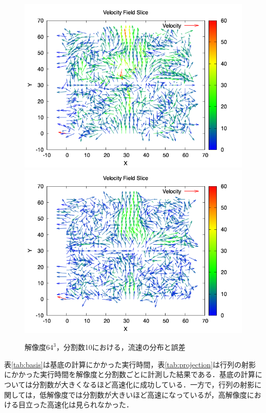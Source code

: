 \documentclass[a4j,12pt]{jreport}
\begin{document}
\begin{figure}[htbp]
\caption{$解像度64^3$，分割数10における，流速の分布と誤差}
\label{fig:n128_vel}
\centering
\includegraphics[width=140mm]{images/velocity_plot_100.png}
\includegraphics[width=140mm]{images/velocity_plot_101.png}
\end{figure}

表\ref{tab:basis}は基底の計算にかかった実行時間，表\ref{tab:projection}は行列の射影にかかった実行時間を解像度と分割数ごとに計測した結果である．基底の計算については分割数が大きくなるほど高速化に成功している．一方で，行列の射影に関しては，低解像度では分割数が大きいほど高速になっているが，高解像度における目立った高速化は見られなかった．
\end{document}

